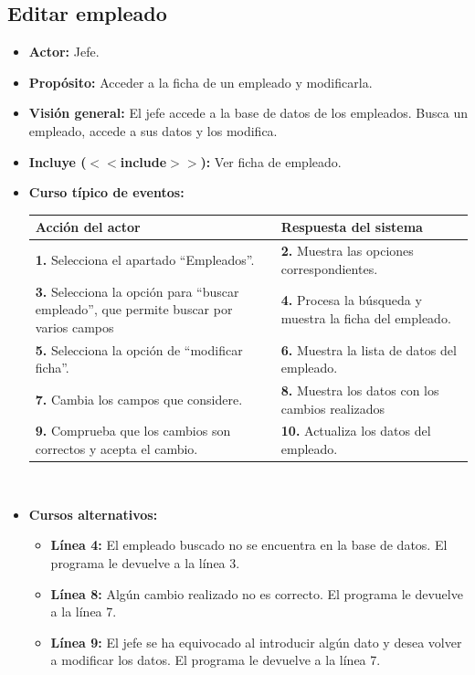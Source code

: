 \documentclass[spanish,a4paper,11pt, twoside]{report}	%
\begin{document}

	\subsection{Editar empleado}		
			\begin{itemize}
			\item \textbf{Actor:} Jefe.
			\item \textbf{Propósito:} Acceder a la ficha de un empleado y modificarla.
			\item \textbf{Visión general:} El jefe accede a la base de datos de los empleados. 
				Busca un empleado, accede a sus datos y los modifica. 
			\item \textbf{Incluye ($<<$include$>>$):} Ver ficha de empleado.
			\item \textbf{Curso típico de eventos:} 	\\
				\begin{tabular}{|p{6cm}||p{6cm}|}
				\hline
				\textbf{Acción del actor} & \textbf{Respuesta del sistema} \\ \hline \hline
				\textbf{1.} Selecciona el apartado ``Empleados''. & 
				\textbf{2.} Muestra las opciones correspondientes. \\ \hline
				\textbf{3.} Selecciona la opción para ``buscar empleado'', que permite  buscar por varios campos	& 
				\textbf{4.} Procesa la búsqueda y muestra la ficha del empleado. \\ \hline
				\textbf{5.} Selecciona la opción de ``modificar ficha''. & 
				\textbf{6.} Muestra la lista de datos del empleado.\\ \hline
				\textbf{7.} Cambia los campos que considere. & 
				\textbf{8.} Muestra los datos con los cambios realizados \\ \hline
				\textbf{9.} Comprueba que los cambios son correctos y acepta el cambio. & 
				\textbf{10. }Actualiza los datos del empleado. \\ \hline
			\end{tabular}
			\\
			\item \textbf{Cursos alternativos:} 
			\begin{itemize}
				\item  \textbf{Línea 4:} El empleado buscado no se encuentra en la base de
					datos. El programa le devuelve a la línea 3.
				\item  \textbf{Línea 8:} Algún cambio realizado no es correcto. El programa le
					devuelve a la línea 7.
				\item  \textbf{Línea 9:} El jefe se ha equivocado al introducir algún dato y
					desea volver a modificar los datos. El programa le devuelve a la línea 7.
			
			\end {itemize}
		\end{itemize}
\end{document}
